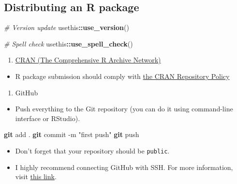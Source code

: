 \documentclass[
]{book}
\newenvironment{Shaded}{\begin{snugshade}}{\end{snugshade}}
\newcommand{\AttributeTok}[1]{\textcolor[rgb]{0.13,0.29,0.53}{#1}}
\newcommand{\CommentTok}[1]{\textcolor[rgb]{0.56,0.35,0.01}{\textit{#1}}}
\newcommand{\FunctionTok}[1]{\textcolor[rgb]{0.13,0.29,0.53}{\textbf{#1}}}
\newcommand{\NormalTok}[1]{#1}
\newcommand{\SpecialCharTok}[1]{\textcolor[rgb]{0.81,0.36,0.00}{\textbf{#1}}}
\newcommand{\StringTok}[1]{\textcolor[rgb]{0.31,0.60,0.02}{#1}}
\providecommand{\tightlist}{%
  \setlength{\itemsep}{0pt}\setlength{\parskip}{0pt}}
\begin{document}
\subsection{Distributing an R package}\label{distributing-an-r-package}

\begin{Shaded}
\begin{Highlighting}[]
\CommentTok{\# Version update }
\NormalTok{usethis}\SpecialCharTok{::}\FunctionTok{use\_version}\NormalTok{()}

\CommentTok{\# Spell check}
\NormalTok{usethis}\SpecialCharTok{::}\FunctionTok{use\_spell\_check}\NormalTok{()}
\end{Highlighting}
\end{Shaded}

\begin{enumerate}
\def\labelenumi{\arabic{enumi}.}
\tightlist
\item
  \href{https://cran.r-project.org/}{CRAN (The Comprehensive R Archive Network)}
\end{enumerate}

\begin{itemize}
\tightlist
\item
  R package submission should comply with \href{https://cran.r-project.org/}{the CRAN Repository Policy}
\end{itemize}

\begin{enumerate}
\def\labelenumi{\arabic{enumi}.}
\setcounter{enumi}{1}
\tightlist
\item
  GitHub
\end{enumerate}

\begin{itemize}
\tightlist
\item
  Push everything to the Git repository (you can do it using command-line interface or RStudio).
\end{itemize}

\begin{Shaded}
\begin{Highlighting}[]
\FunctionTok{git}\NormalTok{ add . }
\FunctionTok{git}\NormalTok{ commit }\AttributeTok{{-}m} \StringTok{"first push"}
\FunctionTok{git}\NormalTok{ push }
\end{Highlighting}
\end{Shaded}

\begin{itemize}
\item
  Don't forget that your repository should be \texttt{public}.
\item
  I highly recommend connecting GitHub with SSH. For more information, visit \href{https://docs.github.com/en/github/authenticating-to-github/connecting-to-github-with-ssh}{this link}.
\end{itemize}
\end{document}
